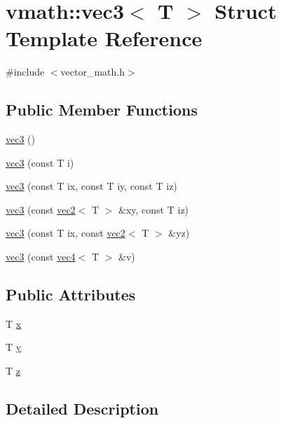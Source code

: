 \hypertarget{structvmath_1_1vec3}{\section{vmath\-:\-:vec3$<$ T $>$ Struct Template Reference}
\label{structvmath_1_1vec3}
}


{\ttfamily \#include $<$vector\-\_\-math.\-h$>$}

\subsection*{Public Member Functions}
\begin{DoxyCompactItemize}
\item 
\hyperlink{structvmath_1_1vec3_a14b2cfc90ae963f67071455d715a15f2}{vec3} ()
\item 
\hyperlink{structvmath_1_1vec3_ada2dd0a6d93a55b9c829987a4c25801a}{vec3} (const T i)
\item 
\hyperlink{structvmath_1_1vec3_a953e5450c720b3a356b1d5d5d17e37e4}{vec3} (const T ix, const T iy, const T iz)
\item 
\hyperlink{structvmath_1_1vec3_a31deb4217d777baf21665b6fed333170}{vec3} (const \hyperlink{structvmath_1_1vec2}{vec2}$<$ T $>$ \&xy, const T iz)
\item 
\hyperlink{structvmath_1_1vec3_aefa049de270ba00f7ba7b2bd8a737a2a}{vec3} (const T ix, const \hyperlink{structvmath_1_1vec2}{vec2}$<$ T $>$ \&yz)
\item 
\hyperlink{structvmath_1_1vec3_a87ea532152d6073ec8d979f118503018}{vec3} (const \hyperlink{structvmath_1_1vec4}{vec4}$<$ T $>$ \&v)
\end{DoxyCompactItemize}
\subsection*{Public Attributes}
\begin{DoxyCompactItemize}
\item 
T \hyperlink{structvmath_1_1vec3_a50c3c4bf7a1cc7c2955540f8165c4b0b}{x}
\item 
T \hyperlink{structvmath_1_1vec3_a1825ec6da542558bae245bdd38934c96}{y}
\item 
T \hyperlink{structvmath_1_1vec3_aba053d0c10467794674d1286a9900454}{z}
\end{DoxyCompactItemize}


\subsection{Detailed Description}
